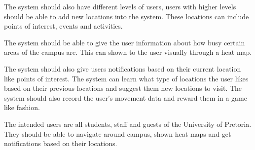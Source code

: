 \documentclass[11pt]{article}
\begin{document}
	The system should also have different levels of users, users with higher levels should be able to add new locations into the system. These locations can include points of interest, events and activities.
	
	The system should be able to give the user information about how busy certain areas of the campus are. This can shown to the user visually through a heat map.
	
	The system should also give users notifications based on their current location like points of interest. The system can learn what type of locations the user likes based on their previous locations and suggest them new locations to visit. The system should also record the user's movement data and reward them in a game like fashion. 
	
	    The intended users are all students, staff and guests of the University of Pretoria. They should be able to navigate around campus, shown heat maps and get notifications based on their locations.
	
\end{document}
